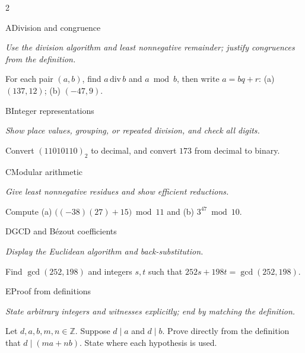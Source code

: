 \documentclass[9pt]{extarticle}
\begin{document}
\begin{multicols}{2}
\begin{CoreProblem}{A}{Division and congruence}
{\scriptsize\textit{Use the division algorithm and least nonnegative remainder; justify congruences from the definition.}\par}
For each pair $(a,b)$, find $a\,\mathrm{div}\,b$ and $a\bmod b$, then write
$a=bq+r$: (a) $(137,12)$; (b) $(-47,9)$.
\end{CoreProblem}
\begin{CoreProblem}{B}{Integer representations}
{\scriptsize\textit{Show place values, grouping, or repeated division, and check all digits.}\par}
Convert $(11010110)_2$ to decimal, and convert $173$ from decimal to binary.
\end{CoreProblem}
\begin{CoreProblem}{C}{Modular arithmetic}
{\scriptsize\textit{Give least nonnegative residues and show efficient reductions.}\par}
Compute (a) $\bigl((-38)(27)+15\bigr)\bmod11$ and
(b) $3^{47}\bmod10$.
\end{CoreProblem}
\columnbreak
\begin{CoreProblem}{D}{GCD and B\'ezout coefficients}
{\scriptsize\textit{Display the Euclidean algorithm and back-substitution.}\par}
Find $\gcd(252,198)$ and integers $s,t$ such that
$252s+198t=\gcd(252,198)$.
\end{CoreProblem}
\begin{CoreProblem}{E}{Proof from definitions}
{\scriptsize\textit{State arbitrary integers and witnesses explicitly; end by matching the definition.}\par}
Let $d,a,b,m,n\in\mathbb Z$. Suppose $d\mid a$ and $d\mid b$. Prove directly
from the definition that $d\mid(ma+nb)$. State where each hypothesis is used.
\end{CoreProblem}
\end{multicols}
\CoreWorkArea
\FormBreak
{}
\end{document}
